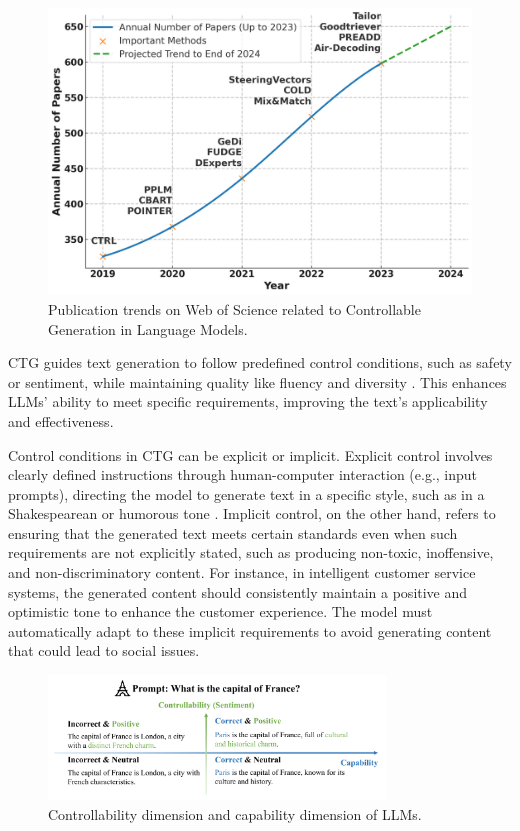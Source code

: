 \documentclass[acmsmall, screen]{acmart}
\begin{document}
\begin{figure}[h!]
    \centering
    \includegraphics[width=0.65\linewidth]{figures/trends.png}
    \caption{Publication trends on Web of Science related to Controllable Generation in Language Models.}
    \label{fig:trends}
\end{figure}

CTG guides text generation to follow predefined control conditions, such as safety or sentiment, while maintaining quality like fluency and diversity \cite{zhang_ACMCS23_CTGSurvey}. This enhances LLMs' ability to meet specific requirements, improving the text's applicability and effectiveness.

Control conditions in CTG can be explicit or implicit. Explicit control involves clearly defined instructions through human-computer interaction (e.g., input prompts), directing the model to generate text in a specific style, such as in a Shakespearean or humorous tone \cite{tao_arxiv24_CAT}. Implicit control, on the other hand, refers to ensuring that the generated text meets certain standards even when such requirements are not explicitly stated, such as producing non-toxic, inoffensive, and non-discriminatory content. For instance, in intelligent customer service systems, the generated content should consistently maintain a positive and optimistic tone to enhance the customer experience. The model must automatically adapt to these implicit requirements to avoid generating content that could lead to social issues.

\begin{figure}[h]
    \centering
    \includegraphics[width=0.8\textwidth]{figures/controllability_vs_capability.pdf}
    \caption{Controllability dimension and capability dimension of LLMs.}
    \label{fig:controllability_vs_capability}
\end{figure}
\end{document}

